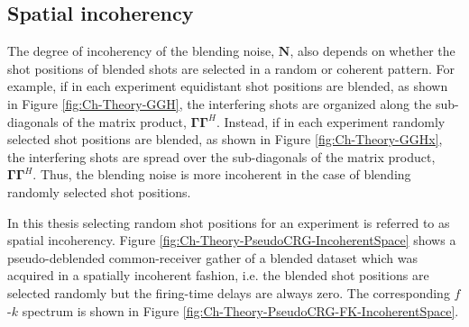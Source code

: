 \subsection*{Spatial incoherency}

The degree of incoherency of the blending noise, $\mathbf{N}$, also depends on whether the shot positions of blended shots are selected in a random or coherent pattern. For example, if in each experiment equidistant shot positions are blended, as shown in Figure \ref{fig:Ch-Theory-GGH}, the interfering shots are organized along the sub-diagonals of the matrix product, $\mathbf{\Gamma\Gamma}^H$. Instead, if in each experiment randomly selected shot positions are blended, as shown in Figure \ref{fig:Ch-Theory-GGHx}, the interfering shots are spread over the sub-diagonals of the matrix product, $\mathbf{\Gamma\Gamma}^H$. Thus, the blending noise is more incoherent in the case of blending randomly selected shot positions.





In this thesis selecting random shot positions for an experiment is referred to as spatial incoherency. Figure \ref{fig:Ch-Theory-PseudoCRG-IncoherentSpace} shows a pseudo-deblended common-receiver gather of a blended dataset which was acquired in a spatially incoherent fashion, i.e. the blended shot positions are selected randomly but the firing-time delays are always zero. The corresponding $f$-$k$ spectrum is shown in Figure \ref{fig:Ch-Theory-PseudoCRG-FK-IncoherentSpace}.

